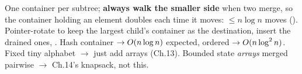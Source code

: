 \begin{recallbox}
One container per subtree; \textbf{always walk the smaller side} when two
merge, so the container holding an element doubles each time it moves:
\(\le n\log n\) moves ().  Pointer-rotate to keep the largest
child's container as the destination, insert the drained ones, .
Hash container \(\to O(n\log n)\) expected, ordered \(\to O(n\log^2 n)\).
Fixed tiny alphabet \(\to\) just add arrays (Ch.13).  Bounded state
\emph{arrays} merged pairwise \(\to\) Ch.14's knapsack, not this.
\end{recallbox}
